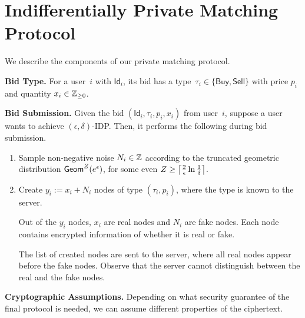 \section{Indifferentially Private Matching Protocol}
\label{sec:algo}

We describe the components of our private matching protocol.

\noindent \textbf{Bid Type.}
For a user~$i$ with $\mathsf{Id}_i$, its bid has a type~$\tau_i \in \{\mathsf{Buy}, \mathsf{Sell}\}$ with price $p_i$
and quantity $x_i \in \mathbb{Z}_{\geq 0}$.



\noindent \textbf{Bid Submission.}
Given the bid $(\mathsf{Id}_i, \tau_i, p_i, x_i)$
from user~$i$, 
suppose a user wants to achieve $(\epsilon, \delta)$-IDP.
Then,
it performs the following during bid submission.
\begin{enumerate}

\item Sample non-negative noise $N_i \in \mathbb{Z}$ 
according to the truncated geometric distribution ${\sf Geom}^Z(e^\epsilon)$,
for some even $Z \geq \left \lceil \frac{2}{\epsilon} \ln \frac{1}{\delta} \right \rceil$.


\item Create $y_i := x_i + N_i$ nodes of type $(\tau_i, p_i)$,
where the type is known to the server.

Out of the $y_i$ nodes, $x_i$ are real nodes and $N_i$ are fake nodes.
Each node contains encrypted information of whether it is real or fake.

The list of created nodes are sent to the server, where all real nodes
appear before the fake nodes.  
Observe that the server cannot distinguish between
the real and the fake nodes.
\end{enumerate}


\noindent \textbf{Cryptographic Assumptions.}  Depending on what security guarantee of the final protocol is needed, 
we can assume different properties of the ciphertext.

